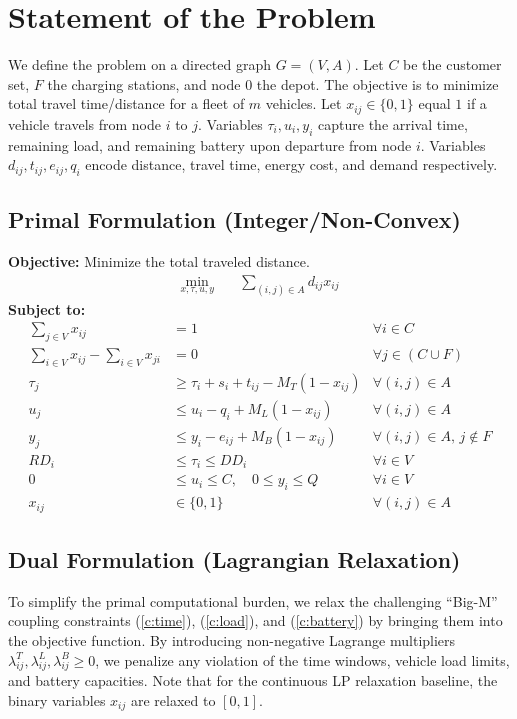 \documentclass[11pt]{article}
\begin{document}
\section{Statement of the Problem}
We define the problem on a directed graph $G=(V, A)$. Let $C$ be the customer set, $F$ the charging stations, and node $0$ the depot. The objective is to minimize total travel time/distance for a fleet of $m$ vehicles. Let $x_{ij} \in \{0, 1\}$ equal $1$ if a vehicle travels from node $i$ to $j$. Variables $\tau_i, u_i, y_i$ capture the arrival time, remaining load, and remaining battery upon departure from node $i$. Variables $d_{ij}, t_{ij}, e_{ij}, q_i$ encode distance, travel time, energy cost, and demand respectively.

\subsection{Primal Formulation (Integer/Non-Convex)}
\textbf{Objective:} Minimize the total traveled distance.
\begin{align}
    \min_{x, \tau, u, y} \quad & \sum_{(i,j) \in A} d_{ij} x_{ij} 
\end{align}
\textbf{Subject to:} 
\begin{align}
    \sum_{j \in V} x_{ij} &= 1 & \forall i \in C \label{c:degree}\\
    \sum_{i \in V} x_{ij} - \sum_{i \in V} x_{ji} &= 0 & \forall j \in (C \cup F) \label{c:flow} \\
    \tau_j &\ge \tau_i + s_i + t_{ij} - M_T(1 - x_{ij}) & \forall (i,j) \in A \label{c:time} \\
    u_j &\le u_i - q_i + M_L(1 - x_{ij}) & \forall (i,j) \in A \label{c:load} \\
    y_j &\le y_i - e_{ij} + M_B(1 - x_{ij}) & \forall (i,j) \in A, \, j \notin F \label{c:battery} \\
    RD_i &\le \tau_i \le DD_i & \forall i \in V \\
    0 &\le u_i \le C, \quad 0 \le y_i \le Q & \forall i \in V \\
    x_{ij} &\in \{0, 1\} & \forall (i,j) \in A
\end{align}

\subsection{Dual Formulation (Lagrangian Relaxation)}
To simplify the primal computational burden, we relax the challenging ``Big-M'' coupling constraints (\ref{c:time}), (\ref{c:load}), and (\ref{c:battery}) by bringing them into the objective function. By introducing non-negative Lagrange multipliers $\lambda^T_{ij}, \lambda^L_{ij}, \lambda^B_{ij} \ge 0$, we penalize any violation of the time windows, vehicle load limits, and battery capacities. Note that for the continuous LP relaxation baseline, the binary variables $x_{ij}$ are relaxed to $[0,1]$.
\end{document}
